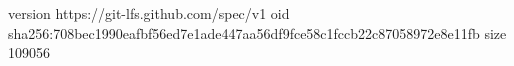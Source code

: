 version https://git-lfs.github.com/spec/v1
oid sha256:708bec1990eafbf56ed7e1ade447aa56df9fce58c1fccb22c87058972e8e11fb
size 109056
